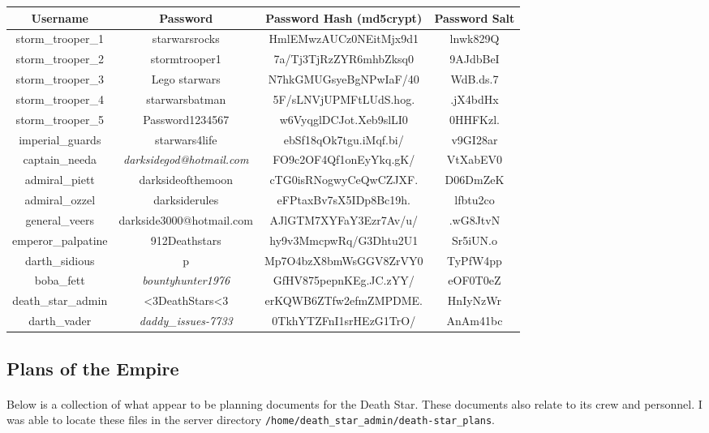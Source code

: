 \documentclass{article}
\begin{document}
\begin{adjustwidth}{-1.5cm}{}
\begin{tabular}{ |c|c|c|c| }
\hline
\textbf{Username} & \textbf{Password} & \textbf{Password Hash (md5crypt)} & \textbf{Password Salt} \\
\hline
storm\_trooper\_1 & starwarsrocks & HmlEMwzAUCz0NEitMjx9d1 & lnwk829Q \\
\hline
storm\_trooper\_2 & stormtrooper1 & 7a/Tj3TjRzZYR6mhbZksq0 & 9AJdbBeI \\
\hline
storm\_trooper\_3 & Lego starwars & N7hkGMUGsyeBgNPwIaF/40 & WdB.ds.7 \\
\hline
storm\_trooper\_4 & starwarsbatman & 5F/sLNVjUPMFtLUdS.hog. & .jX4bdHx \\
\hline
storm\_trooper\_5 & Password1234567 & w6VyqglDCJot.Xeb9slLI0 & 0HHFKzl. \\
\hline
imperial\_guards & starwars4life & ebSf18qOk7tgu.iMqf.bi/ & v9GI28ar \\
\hline
captain\_needa & \emph{darksidegod@hotmail.com} & FO9c2OF4Qf1onEyYkq.gK/ & VtXabEV0 \\
\hline
admiral\_piett & darksideofthemoon & cTG0isRNogwyCeQwCZJXF. & D06DmZeK \\
\hline
admiral\_ozzel & darksiderules & eFPtaxBv7sX5IDp8Bc19h. & lfbtu2co \\
\hline
general\_veers & darkside3000@hotmail.com & AJlGTM7XYFaY3Ezr7Av/u/ & .wG8JtvN \\
\hline
emperor\_palpatine & 912Deathstars & hy9v3MmcpwRq/G3Dhtu2U1 & Sr5iUN.o \\
\hline
darth\_sidious & p & Mp7O4bzX8bmWsGGV8ZrVY0 & TyPfW4pp \\
\hline
boba\_fett & \emph{bountyhunter1976} & GfHV875pepnKEg.JC.zYY/ & eOF0T0eZ \\
\hline
death\_star\_admin & \textless 3DeathStars\textless 3 & erKQWB6ZTfw2efmZMPDME. & HnIyNzWr \\
\hline
darth\_vader & \emph{daddy\_issues-7733} & 0TkhYTZFnI1srHEzG1TrO/ & AnAm41bc \\
\hline
\end{tabular}
\end{adjustwidth}
\newpage

\subsection{Plans of the Empire}
\paragraph{}
Below is a collection of what appear to be planning documents for the Death Star. These documents also relate to its crew and personnel. I was able to locate these files in the server directory \texttt{/home/death\_star\_admin/death-star\_plans}.
\end{document}

